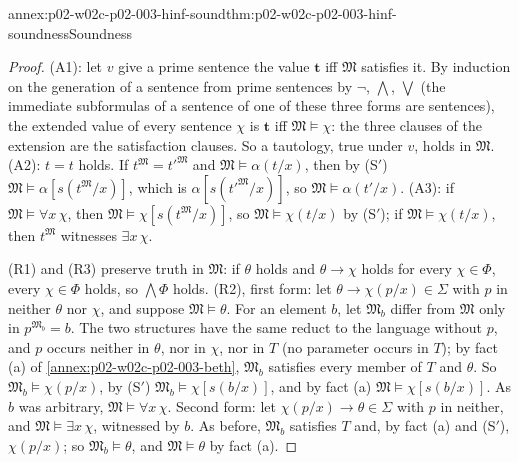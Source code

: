 \begin{annexitem}{annex:p02-w02c-p02-003-hinf-sound}{thm:p02-w02c-p02-003-hinf-soundness}{Soundness}
\begin{proof}
(A1): let \(v\) give a prime sentence the value \(\mathbf t\) iff
\(\mathfrak M\) satisfies it.  By induction on the generation of a sentence
from prime sentences by \(\neg\), \(\bigwedge\), \(\bigvee\) (the immediate
subformulas of a sentence of one of these three forms are sentences), the
extended value of every sentence \(\chi\) is \(\mathbf t\) iff
\(\mathfrak M\models\chi\): the three clauses of the extension are the
satisfaction clauses.  So a tautology, true under \(v\), holds in
\(\mathfrak M\).  (A2): \(t=t\) holds.  If \(t^{\mathfrak M}=t'^{\mathfrak M}\)
and \(\mathfrak M\models\alpha(t/x)\), then by (S\('\))
\(\mathfrak M\models\alpha[s(t^{\mathfrak M}/x)]\), which is
\(\alpha[s(t'^{\mathfrak M}/x)]\), so \(\mathfrak M\models\alpha(t'/x)\).
(A3): if \(\mathfrak M\models\forall x\,\chi\), then
\(\mathfrak M\models\chi[s(t^{\mathfrak M}/x)]\), so
\(\mathfrak M\models\chi(t/x)\) by (S\('\)); if
\(\mathfrak M\models\chi(t/x)\), then \(t^{\mathfrak M}\) witnesses
\(\exists x\,\chi\).

(R1) and (R3) preserve truth in \(\mathfrak M\): if \(\theta\) holds and
\(\theta\to\chi\) holds for every \(\chi\in\Phi\), every \(\chi\in\Phi\)
holds, so \(\bigwedge\Phi\) holds.  (R2), first form: let
\(\theta\to\chi(p/x)\in\Sigma\) with \(p\) in neither \(\theta\) nor
\(\chi\), and suppose \(\mathfrak M\models\theta\).  For an element \(b\),
let \(\mathfrak M_b\) differ from \(\mathfrak M\) only in
\(p^{\mathfrak M_b}=b\).  The two structures have the same reduct to the
language without \(p\), and \(p\) occurs neither in \(\theta\), nor in
\(\chi\), nor in \(T\) (no parameter occurs in \(T\)); by fact (a) of
\cref{annex:p02-w02c-p02-003-beth}, \(\mathfrak M_b\) satisfies every
member of \(T\) and \(\theta\).  So \(\mathfrak M_b\models\chi(p/x)\), by
(S\('\)) \(\mathfrak M_b\models\chi[s(b/x)]\), and by fact (a)
\(\mathfrak M\models\chi[s(b/x)]\).  As \(b\) was arbitrary,
\(\mathfrak M\models\forall x\,\chi\).  Second form: let
\(\chi(p/x)\to\theta\in\Sigma\) with \(p\) in neither, and
\(\mathfrak M\models\exists x\,\chi\), witnessed by \(b\).  As before,
\(\mathfrak M_b\) satisfies \(T\) and, by fact (a) and (S\('\)),
\(\chi(p/x)\); so \(\mathfrak M_b\models\theta\), and
\(\mathfrak M\models\theta\) by fact (a).


\end{proof}
\end{annexitem}
